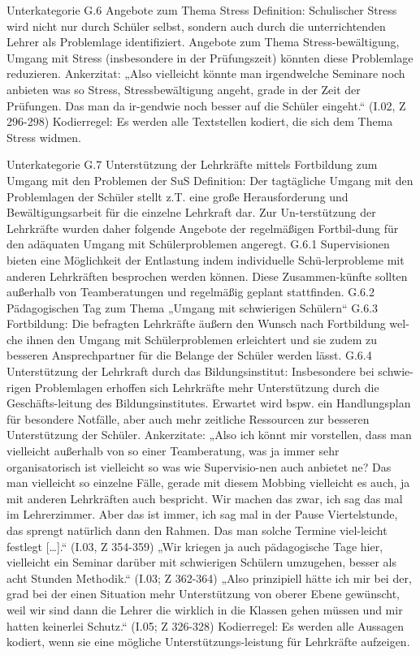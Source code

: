 Unterkategorie G.6 Angebote zum Thema Stress
Definition: Schulischer Stress wird nicht nur durch Schüler selbst, sondern auch durch die unterrichtenden Lehrer als Problemlage identifiziert. Angebote zum Thema Stress-bewältigung, Umgang mit Stress (insbesondere in der Prüfungszeit) könnten diese Problemlage reduzieren.
Ankerzitat: „Also vielleicht könnte man irgendwelche Seminare noch anbieten was so Stress, Stressbewältigung angeht, grade in der Zeit der Prüfungen. Das man da ir-gendwie noch besser auf die Schüler eingeht.“ (I.02, Z 296-298)
Kodierregel: Es werden alle Textstellen kodiert, die sich dem Thema Stress widmen. 

Unterkategorie G.7 Unterstützung der Lehrkräfte mittels Fortbildung zum Umgang mit den Problemen der SuS
Definition: Der tagtägliche Umgang mit den Problemlagen der Schüler stellt z.T. eine große Herausforderung und Bewältigungsarbeit für die einzelne Lehrkraft dar. Zur Un-terstützung der Lehrkräfte wurden daher folgende Angebote der regelmäßigen Fortbil-dung für den adäquaten Umgang mit Schülerproblemen angeregt.
G.6.1 Supervisionen bieten eine Möglichkeit der Entlastung indem individuelle Schü-lerprobleme mit anderen Lehrkräften besprochen werden können. Diese Zusammen-künfte sollten außerhalb von Teamberatungen und regelmäßig geplant stattfinden.
G.6.2 Pädagogischen Tag zum Thema „Umgang mit schwierigen Schülern“ 
G.6.3 Fortbildung: Die befragten Lehrkräfte äußern den Wunsch nach Fortbildung wel-che ihnen den Umgang mit Schülerproblemen erleichtert und sie zudem zu besseren Ansprechpartner für die Belange der Schüler werden lässt. 
G.6.4 Unterstützung der Lehrkraft durch das Bildungsinstitut: Insbesondere bei schwie-rigen Problemlagen erhoffen sich Lehrkräfte mehr Unterstützung durch die Geschäfts-leitung des Bildungsinstitutes. Erwartet wird bspw. ein Handlungsplan für besondere Notfälle, aber auch mehr zeitliche Ressourcen zur besseren Unterstützung der Schüler.
Ankerzitate: „Also ich könnt mir vorstellen, dass man vielleicht außerhalb von so einer Teamberatung, was ja immer sehr organisatorisch ist vielleicht so was wie Supervisio-nen auch anbietet ne? Das man vielleicht so einzelne Fälle, gerade mit diesem Mobbing vielleicht es auch, ja mit anderen Lehrkräften auch bespricht. Wir machen das zwar, ich sag das mal im Lehrerzimmer. Aber das ist immer, ich sag mal in der Pause Viertelstunde, das sprengt natürlich dann den Rahmen. Das man solche Termine viel-leicht festlegt […].“  (I.03, Z 354-359)
„Wir kriegen ja auch pädagogische Tage hier, vielleicht ein Seminar darüber mit schwierigen Schülern umzugehen, besser als acht Stunden Methodik.“ (I.03; Z 362-364)
„Also prinzipiell hätte ich mir bei der, grad bei der einen Situation mehr Unterstützung von oberer Ebene gewünscht, weil wir sind dann die Lehrer die wirklich in die Klassen gehen müssen und mir hatten keinerlei Schutz.“ (I.05; Z 326-328)
Kodierregel: Es werden alle Aussagen kodiert, wenn sie eine mögliche Unterstützungs-leistung für Lehrkräfte aufzeigen.

